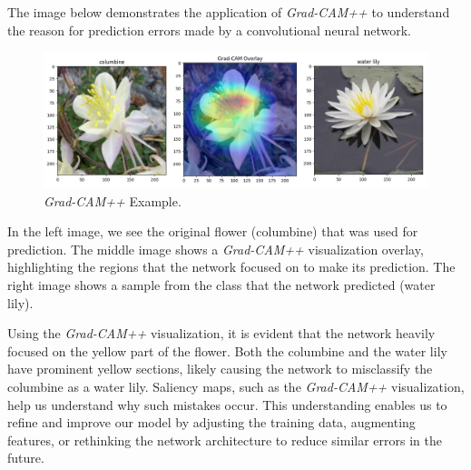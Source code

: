 The image below demonstrates the application of \textit{Grad-CAM++} to understand the reason for prediction errors made by a convolutional neural network.

\begin{figure}[H]
    \centering    \includegraphics[scale=0.4]{Images/gradcam_mine_example.jpg}
    \caption{\textit{Grad-CAM++} Example.}
    \label{fig:gradcamMine}
\end{figure}

In the left image, we see the original flower (columbine) that was used for prediction. The middle image shows a \textit{Grad-CAM++} visualization overlay, highlighting the regions that the network focused on to make its prediction. The right image shows a sample from the class that the network predicted (water lily).


Using the \textit{Grad-CAM++} visualization, it is evident that the network heavily focused on the yellow part of the flower. Both the columbine and the water lily have prominent yellow sections, likely causing the network to misclassify the columbine as a water lily. Saliency maps, such as the \textit{Grad-CAM++} visualization, help us understand why such mistakes occur. This understanding enables us to refine and improve our model by adjusting the training data, augmenting features, or rethinking the network architecture to reduce similar errors in the future.